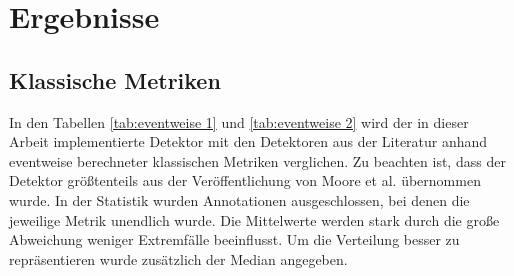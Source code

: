 \chapter{Ergebnisse}

\section{Klassische Metriken}

In den Tabellen \ref{tab:eventweise 1} und \ref{tab:eventweise 2} wird der in dieser Arbeit implementierte Detektor mit den Detektoren aus der Literatur anhand eventweise berechneter klassischen Metriken verglichen. Zu beachten ist, dass der Detektor größtenteils aus der Veröffentlichung von Moore et al. \cite{Moore} übernommen wurde.
In der Statistik wurden Annotationen ausgeschlossen, bei denen die jeweilige Metrik unendlich wurde.
Die Mittelwerte werden stark durch die große Abweichung weniger Extremfälle beeinflusst. Um die Verteilung besser zu repräsentieren wurde zusätzlich der Median angegeben.



